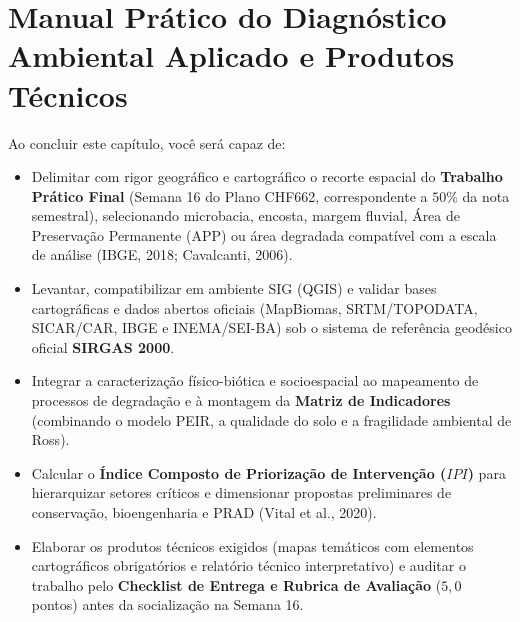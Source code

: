 \chapter{Manual Prático do Diagnóstico Ambiental Aplicado e Produtos Técnicos}
\label{cap:diagnostico_final_pratico}

\noindent\tagPratica
\vspace{4pt}

\begin{capObjetivos}
Ao concluir este capítulo, você será capaz de:
\begin{itemize}[leftmargin=1.5em, itemsep=2.5pt]
  \item Delimitar com rigor geográfico e cartográfico o recorte espacial do \textbf{Trabalho Prático Final} (Semana 16 do Plano CHF662, correspondente a $50\%$ da nota semestral), selecionando microbacia, encosta, margem fluvial, Área de Preservação Permanente (APP) ou área degradada compatível com a escala de análise (IBGE, 2018; Cavalcanti, 2006).
  \item Levantar, compatibilizar em ambiente SIG (QGIS) e validar bases cartográficas e dados abertos oficiais (MapBiomas, SRTM/TOPODATA, SICAR/CAR, IBGE e INEMA/SEI-BA) sob o sistema de referência geodésico oficial \textbf{SIRGAS 2000}.
  \item Integrar a caracterização físico-biótica e socioespacial ao mapeamento de processos de degradação e à montagem da \textbf{Matriz de Indicadores} (combinando o modelo PEIR, a qualidade do solo e a fragilidade ambiental de Ross).
  \item Calcular o \textbf{Índice Composto de Priorização de Intervenção ($IPI$)} para hierarquizar setores críticos e dimensionar propostas preliminares de conservação, bioengenharia e PRAD (Vital et al., 2020).
  \item Elaborar os produtos técnicos exigidos (mapas temáticos com elementos cartográficos obrigatórios e relatório técnico interpretativo) e auditar o trabalho pelo \textbf{Checklist de Entrega e Rubrica de Avaliação} ($5{,}0$ pontos) antes da socialização na Semana 16.
\end{itemize}
\end{capObjetivos}

